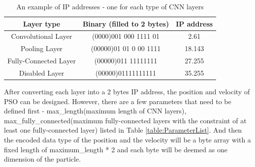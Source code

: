 \documentclass[conference]{IEEEtran}
\begin{document}
\begin{table}[!t]
	\renewcommand{\arraystretch}{1.3}
	\caption{An example of IP addresses - one for each type of CNN layers}
	\label{table:IPExample}
	\centering
	\begin{tabular}{|c|c|c|}
		\hline
		Layer type & Binary (filled to 2 bytes) & IP address\\
		\hline
		Convolutional Layer & (0000)001 000 1111 01 & 2.61\\
		\hline
		Pooling Layer & (00000)01 01 0 00 1111 & 18.143\\
		\hline
		Fully-Connected Layer & (00000)011 11111111 & 27.255\\
		\hline
		Disabled Layer & (00000)01111111111 & 35.255\\
		\hline
	\end{tabular}
\end{table}

After converting each layer into a 2 bytes IP address, the position and velocity of PSO can be designed. However, there are a few parameters that need to be defined first - max\_length(maximum length of CNN layers), max\_fully\_connected(maximum fully-connected layers with the constraint of at least one fully-connected layer) listed in Table \ref{table:ParameterList}. And then the encoded data type of the position and the velocity will be a byte array with a fixed length of maximum\_length * 2 and each byte will be deemed as one dimension of the particle.
\end{document}
